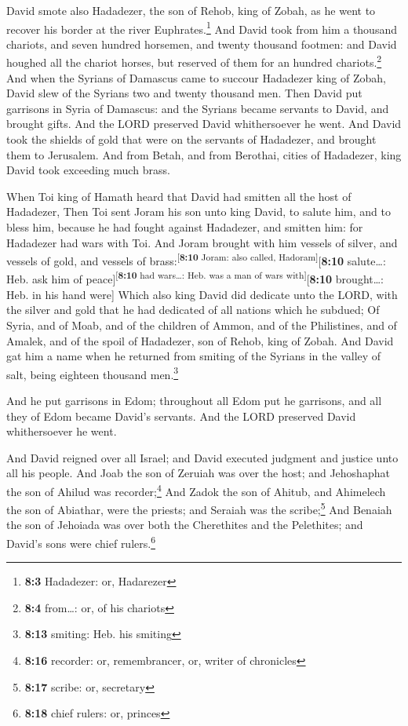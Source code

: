  David smote also Hadadezer, the son of Rehob, king of
Zobah, as he went to recover his border at the river
Euphrates.\footnote{\textbf{8:3} Hadadezer: or, Hadarezer}
 And David took from him a thousand chariots, and seven
hundred horsemen, and twenty thousand footmen: and David houghed all the
chariot horses, but reserved of them for an hundred chariots.\footnote{\textbf{8:4}
  from\ldots: or, of his chariots}  And when the Syrians
of Damascus came to succour Hadadezer king of Zobah, David slew of the
Syrians two and twenty thousand men.  Then David put
garrisons in Syria of Damascus: and the Syrians became servants to
David, and brought gifts. And the LORD preserved David whithersoever he
went.  And David took the shields of gold that were on the
servants of Hadadezer, and brought them to Jerusalem.  And
from Betah, and from Berothai, cities of Hadadezer, king David took
exceeding much brass.

 When Toi king of Hamath heard that David had smitten all
the host of Hadadezer,  Then Toi sent Joram his son unto
king David, to salute him, and to bless him, because he had fought
against Hadadezer, and smitten him: for Hadadezer had wars with Toi. And
Joram brought with him vessels of silver, and vessels of gold, and
vessels of brass:\textsuperscript{{[}\textbf{8:10} Joram: also called,
Hadoram{]}}{[}\textbf{8:10} salute\ldots: Heb. ask him of
peace{]}\textsuperscript{{[}\textbf{8:10} had wars\ldots: Heb. was a man
of wars with{]}}{[}\textbf{8:10} brought\ldots: Heb. in his hand were{]}
 Which also king David did dedicate unto the LORD, with
the silver and gold that he had dedicated of all nations which he
subdued;  Of Syria, and of Moab, and of the children of
Ammon, and of the Philistines, and of Amalek, and of the spoil of
Hadadezer, son of Rehob, king of Zobah.  And David gat
him a name when he returned from smiting of the Syrians in the valley of
salt, being eighteen thousand men.\footnote{\textbf{8:13} smiting: Heb.
  his smiting}

 And he put garrisons in Edom; throughout all Edom put he
garrisons, and all they of Edom became David's servants. And the LORD
preserved David whithersoever he went.

 And David reigned over all Israel; and David executed
judgment and justice unto all his people.  And Joab the
son of Zeruiah was over the host; and Jehoshaphat the son of Ahilud was
recorder;\footnote{\textbf{8:16} recorder: or, remembrancer, or, writer
  of chronicles}  And Zadok the son of Ahitub, and
Ahimelech the son of Abiathar, were the priests; and Seraiah was the
scribe;\footnote{\textbf{8:17} scribe: or, secretary} 
And Benaiah the son of Jehoiada was over both the Cherethites and the
Pelethites; and David's sons were chief rulers.\footnote{\textbf{8:18}
  chief rulers: or, princes}


